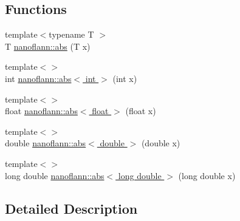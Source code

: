 \subsection*{Functions}
\begin{DoxyCompactItemize}
\item 
{\footnotesize template$<$typename T $>$ }\\T \hyperlink{group__metric__grp_gaf15608f8914516f8d949a8c053d55021}{nanoflann\-::abs} (T x)
\item 
{\footnotesize template$<$$>$ }\\int \hyperlink{group__metric__grp_ga5c50e8d34773da556210ad34d6157763}{nanoflann\-::abs$<$ int $>$} (int x)
\item 
{\footnotesize template$<$$>$ }\\float \hyperlink{group__metric__grp_ga3c252a1b86662381fd025b0576124c2d}{nanoflann\-::abs$<$ float $>$} (float x)
\item 
{\footnotesize template$<$$>$ }\\double \hyperlink{group__metric__grp_ga3fb0513e5af33647f17713a36b10f156}{nanoflann\-::abs$<$ double $>$} (double x)
\item 
{\footnotesize template$<$$>$ }\\long double \hyperlink{group__metric__grp_ga02cfdf1bf211628b049ffd239a26e57e}{nanoflann\-::abs$<$ long double $>$} (long double x)
\end{DoxyCompactItemize}


\subsection{Detailed Description}


